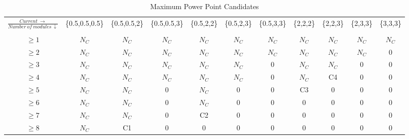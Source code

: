 \documentclass[conference]{IEEEtran}
\begin{document}
\begin{table}[bp]
\caption{Maximum Power Point Candidates}
  \begin{center}
    \begin{tabular}[]{ccccccccccc}
 $\frac{Current\ \rightarrow }{Number\ of\ modules\ \downarrow}$&\{0.5,0.5,0.5\}&\{0.5,0.5,2\}&\{0.5,0.5,3\}&\{0.5,2,2\}&\{0.5,2,3\}&\{0.5,3,3\}&\{2,2,2\}&\{2,2,3\}&\{2,3,3\}&\{3,3,3\}\\  \\ \hline \hline
$\geq 1$ &$N_C$  &$N_C$  &$N_C$  &$N_C$  &$N_C$  &$N_C$  &$N_C$  &$N_C$  &$N_C$  &$N_C$  \\
$\geq 2$ &$N_C$  &$N_C$  &$N_C$  &$N_C$  &$N_C$  &$N_C$  &$N_C$  &$N_C$  &$N_C$  &0  \\
$\geq 3$ &$N_C$  &$N_C$  &$N_C$  &$N_C$  &$N_C$  &0  &$N_C$  &$N_C$  &0      &0 \\
$\geq 4$ &$N_C$  &$N_C$  &$N_C$  &$N_C$  &$N_C$  &0  &$N_C$  & C4    &0      &0 \\
$\geq 5$ &$N_C$  &$N_C$  &0      &$N_C$  &0     &0      &C3     &0      &0      &0  \\
$\geq 6$ &$N_C$  &$N_C$  &0      &$N_C$  &0     &0      &0      &0      &0      &0 \\
$\geq 7$ &$N_C$  &$N_C$  &0      &C2     &0     &0      &0      &0      &0      &0 \\
$\geq 8$ &$N_C$  &C1     &0      &0      &0     &0      &0      &0      &0      &0
    \end{tabular}\label{mppcandidates}
    \end{center}
\end{table}




\end{document}
